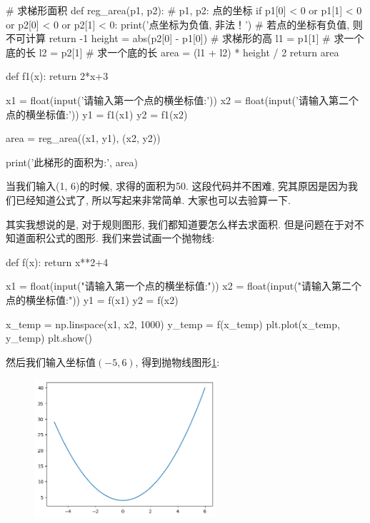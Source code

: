 \begin{python}
# 求梯形面积
def reg_area(p1, p2):
    # p1, p2: 点的坐标
    if p1[0] < 0 or p1[1] < 0 or p2[0] < 0 or p2[1] < 0:
        print('点坐标为负值, 非法！') # 若点的坐标有负值, 则不可计算
        return -1
    height = abs(p2[0] - p1[0]) # 求梯形的高
    l1 = p1[1] # 求一个底的长
    l2 = p2[1] # 求一个底的长
    area = (l1 + l2) * height / 2
    return area

def f1(x):
    return 2*x+3

x1 = float(input('请输入第一个点的横坐标值:'))
x2 = float(input('请输入第二个点的横坐标值:'))
y1 = f1(x1)
y2 = f1(x2)

area = reg_area((x1, y1), (x2, y2))

print('此梯形的面积为:', area)
\end{python}

当我们输入(1, 6)的时候, 求得的面积为50. 这段代码并不困难, 究其原因是因为我们已经知道公式了, 所以写起来非常简单. 大家也可以去验算一下. 

其实我想说的是, 对于规则图形, 我们都知道要怎么样去求面积. 但是问题在于对不知道面积公式的图形. 我们来尝试画一个抛物线:

\begin{python}
def f(x):
    return x**2+4

x1 = float(input("请输入第一个点的横坐标值:"))
x2 = float(input("请输入第二个点的横坐标值:"))
y1 = f(x1)
y2 = f(x2)

x_temp = np.linspace(x1, x2, 1000)
y_temp = f(x_temp)
plt.plot(x_temp, y_temp)
plt.show()
\end{python}

然后我们输入坐标值$(-5,6)$, 得到抛物线图形\ref{fig:img13_9}:

\begin{figure}[ht]
  \centering
  \includegraphics[width=0.6\textwidth]{asset/20230903151121.png}
  \caption{}
  \label{fig:img13_9}
\end{figure}

